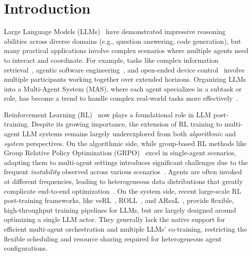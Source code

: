\section{Introduction}
Large Language Models (LLMs)~\citep{achiam2023gpt,team2023gemini,liu2024deepseek,yang2025qwen3} have demonstrated impressive reasoning abilities across diverse domains (e.g., question answering, code generation), but many practical applications involve complex scenarios where multiple agents need to interact and coordinate. For example, tasks like complex information retrieval~\citep{chang2025main,zhang2025agentorchestra}, agentic software engineering~\citep{hong2024metagpt,qian2024chatdev}, and open-ended device control~\citep{wang2024mobile,tan2024cradle} involve multiple participants working together over extended horizons. Organizing LLMs into a Multi-Agent System (MAS), where each agent specializes in a subtask or role, has become a trend to handle complex real-world tasks more effectively~\citep{tran2025multi,zhang2025landscape}.


Reinforcement Learning (RL)~\citep{sutton2018reinforcement} now plays a foundational role in LLM post-training. Despite its growing importance, the extension of RL training to multi-agent LLM systems remains largely underexplored from both \textit{algorithmic} and \textit{system} perspectives.
On the algorithmic side, while group-based RL methods like Group Relative Policy Optimization (GRPO)~\citep{shao2024deepseekmath} excel in single-agent scenarios, adapting them to multi-agent settings introduces significant challenges due to the frequent \textit{instability} observed across various scenarios~\citep{chen2025heterogeneous,zhao2025stronger,yuan2025marshal}. Agents are often invoked at different frequencies, leading to heterogeneous data distributions that greatly complicate end-to-end optimization~\citep{hong2025multi}.
On the system side, recent large-scale RL post-training frameworks, like veRL~\citep{sheng2024hybridflow}, ROLL~\citep{wang2025reinforcement}, and AReaL~\citep{fu2025areal}, provide flexible, high-throughput training pipelines for LLMs, but are largely designed around optimizing a single LLM actor. They generally lack the native support for efficient multi-agent orchestration and multiple LLMs' co-training, restricting the flexible scheduling and resource sharing required for heterogeneous agent configurations.


